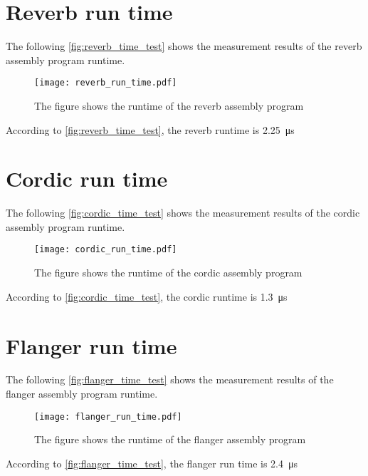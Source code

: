 \section*{Reverb run time}
The following \autoref{fig:reverb_time_test} shows the measurement results of the \gls{reverb} assembly program runtime.
\begin{figure}[htbp!]
	\centering
		\texttt{[image: reverb\_run\_time.pdf]}
		\caption{The figure shows the runtime of the \gls{reverb} assembly program}
		\label{fig:reverb_time_test}
\end{figure}

According to \autoref{fig:reverb_time_test}, the \gls{reverb} runtime is \SI{2.25}{\micro\second}

\section*{Cordic run time}
The following \autoref{fig:cordic_time_test} shows the measurement results of the cordic assembly program runtime.
\begin{figure}[htbp!]
	\centering
		\texttt{[image: cordic\_run\_time.pdf]}
		\caption{The figure shows the runtime of the cordic assembly program}
		\label{fig:cordic_time_test}
\end{figure}

According to \autoref{fig:cordic_time_test}, the cordic runtime is \SI{1.3}{\micro\second}

\section*{Flanger run time}
The following \autoref{fig:flanger_time_test} shows the measurement results of the flanger assembly program runtime.
\begin{figure}[htbp!]
	\centering
		\texttt{[image: flanger\_run\_time.pdf]}
		\caption{The figure shows the runtime of the flanger assembly program}
		\label{fig:flanger_time_test}
\end{figure}

According to \autoref{fig:flanger_time_test}, the flanger run time is \SI{2.4}{\micro\second}